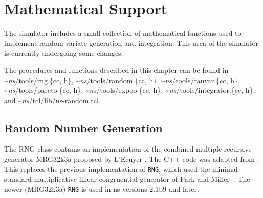 
\chapter{Mathematical Support}
\label{chap:math}

The simulator includes a small collection of mathematical
functions used to implement random variate generation and integration.
This area of the simulator is currently undergoing some
changes.

The procedures and functions described in this chapter can be found in
\textasciitilde\emph{ns}/{tools/rng.\{cc, h\}},
\textasciitilde\emph{ns}/{tools/random.\{cc, h\}},
\textasciitilde\emph{ns}/{tools/ranvar.\{cc, h\}},
\textasciitilde\emph{ns}/{tools/pareto.\{cc, h\}},
\textasciitilde\emph{ns}/{tools/expoo.\{cc, h\}},
\textasciitilde\emph{ns}/{tools/integrator.\{cc, h\}}, and
\textasciitilde\emph{ns}/{tcl/lib/ns-random.tcl}.


\section{Random Number Generation}
\label{sec:random}

The RNG class contains an implementation of the combined multiple
recursive generator MRG32k3a proposed by L'Ecuyer
\cite{lecuyer99}. The C++ code was adapted from \cite{lecuyer01}.
This replaces the previous implementation of {\tt RNG}, which used
the minimal standard multiplicative linear congruential generator of
Park and Miller~\cite{Park88:Random}.  The newer (MRG32k3a) {\tt RNG} is
used in ns versions 2.1b9 and later.


